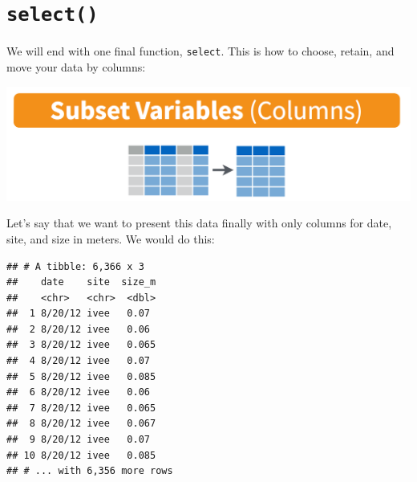 \documentclass[]{book}
\newenvironment{Shaded}{\begin{snugshade}}{\end{snugshade}}
\newcommand{\DataTypeTok}[1]{\textcolor[rgb]{0.13,0.29,0.53}{#1}}
\newcommand{\DecValTok}[1]{\textcolor[rgb]{0.00,0.00,0.81}{#1}}
\newcommand{\KeywordTok}[1]{\textcolor[rgb]{0.13,0.29,0.53}{\textbf{#1}}}
\newcommand{\NormalTok}[1]{#1}
\newcommand{\OperatorTok}[1]{\textcolor[rgb]{0.81,0.36,0.00}{\textbf{#1}}}
\newcommand{\StringTok}[1]{\textcolor[rgb]{0.31,0.60,0.02}{#1}}
\begin{document}
\begin{Shaded}
\end{Shaded}

\hypertarget{select}{%
\section{\texorpdfstring{\texttt{select()}}{select()}}\label{select}}

We will end with one final function, \texttt{select}. This is how to choose, retain, and move your data by columns:

\includegraphics[width=0.8\linewidth]{img/rstudio-cheatsheet-select}

Let's say that we want to present this data finally with only columns for date, site, and size in meters. We would do this:

\begin{Shaded}
\end{Shaded}

\begin{verbatim}
## # A tibble: 6,366 x 3
##    date    site  size_m
##    <chr>   <chr>  <dbl>
##  1 8/20/12 ivee   0.07 
##  2 8/20/12 ivee   0.06 
##  3 8/20/12 ivee   0.065
##  4 8/20/12 ivee   0.07 
##  5 8/20/12 ivee   0.085
##  6 8/20/12 ivee   0.06 
##  7 8/20/12 ivee   0.065
##  8 8/20/12 ivee   0.067
##  9 8/20/12 ivee   0.07 
## 10 8/20/12 ivee   0.085
## # ... with 6,356 more rows
\end{verbatim}
\end{document}
